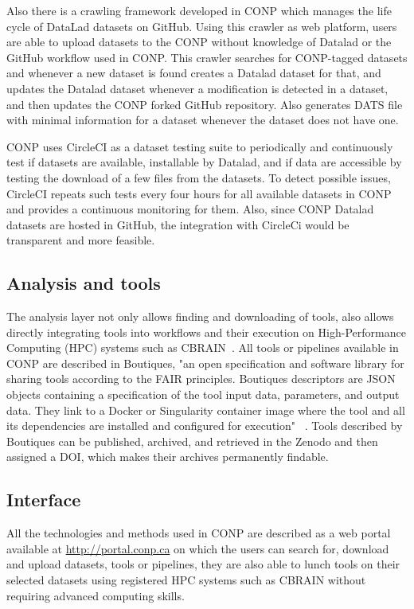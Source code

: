 Also there is a crawling framework developed in CONP which manages the life cycle of DataLad datasets on GitHub. Using this crawler as web platform, users are able to upload datasets to the CONP without knowledge of Datalad or the GitHub workflow used in CONP. This crawler searches for CONP-tagged datasets and whenever a new dataset is found creates a Datalad dataset for that, and updates the Datalad dataset whenever a modification is detected in a dataset, and then updates the CONP forked GitHub repository. Also generates DATS file with minimal information for a dataset whenever the dataset does not have one.

CONP uses CircleCI as a dataset testing suite to periodically and continuously test if datasets are available, installable by Datalad, and if data are accessible by testing the download of a few files from the datasets. To detect possible issues, CircleCI repeats such tests every four hours for all available datasets in CONP and provides a continuous monitoring for them. Also, since CONP Datalad datasets are hosted in GitHub, the integration with CircleCi would be transparent and more feasible.

\subsection{Analysis and tools}
The analysis layer not only allows finding and downloading of tools, also allows directly integrating tools into workflows and their execution on High-Performance Computing (HPC) systems such as CBRAIN~\cite{}. All tools or pipelines available in CONP are described in Boutiques, "an open specification and software library for sharing tools according to the FAIR principles. Boutiques descriptors are JSON objects containing a specification of the tool input data, parameters, and output data. They link to a Docker or Singularity container image where the tool and all its dependencies are installed and configured for execution"~\cite{conp}  . Tools described by Boutiques  can be published, archived, and retrieved in the Zenodo and then assigned a DOI, which makes their archives permanently findable.

\subsection{Interface}
All the technologies and methods used in CONP are described as a web portal available at \url{http://portal.conp.ca} on which the users can search for, download and upload datasets, tools or pipelines, they are also able to lunch tools on their selected datasets using registered HPC systems such as CBRAIN without requiring advanced computing skills.  


